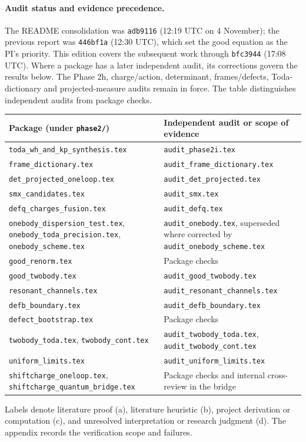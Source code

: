 \documentclass[11pt,a4paper]{article}
\newcommand{\file}[1]{\nolinkurl{#1}}
\theoremstyle{remark}\newtheorem{remark}[proposition]{Remark}
\begin{document}
\paragraph{Audit status and evidence precedence.}
The README consolidation was \file{adb9116} (12:19 UTC on 4 November);
the previous report was \file{446bf1a} (12:30 UTC), which set the good
equation as the PI's priority. This edition covers the subsequent work
through \file{bfc3944} (17:08 UTC). Where a package has a later independent
audit, its corrections govern the results below. The Phase 2h, charge/action, determinant,
frames/defects, Toda-dictionary and projected-measure audits remain in force.
The table distinguishes independent audits from package checks.
\begin{center}\small
\begin{tabular}{@{}L{7.2cm}L{7.2cm}@{}}\toprule
Package (under \file{phase2/}) & Independent audit or scope of evidence\\\midrule
\file{toda_wh_and_kp_synthesis.tex} & \file{audit_phase2i.tex}\\
\file{frame_dictionary.tex} & \file{audit_frame_dictionary.tex}\\
\file{det_projected_oneloop.tex} & \file{audit_det_projected.tex}\\
\file{smx_candidates.tex} & \file{audit_smx.tex}\\
\file{defq_charges_fusion.tex} & \file{audit_defq.tex}\\
\file{onebody_dispersion_test.tex}, \file{onebody_toda_precision.tex},
\file{onebody_scheme.tex} & \file{audit_onebody.tex}, superseded where corrected
by \file{audit_onebody_scheme.tex}\\
\file{good_renorm.tex} & Package checks\\
\file{good_twobody.tex} & \file{audit_good_twobody.tex}\\
\file{resonant_channels.tex} & \file{audit_resonant_channels.tex}\\
\file{defb_boundary.tex} & \file{audit_defb_boundary.tex}\\
\file{defect_bootstrap.tex} & Package checks\\
\file{twobody_toda.tex}, \file{twobody_cont.tex} &
\file{audit_twobody_toda.tex}, \file{audit_twobody_cont.tex}\\
\file{uniform_limits.tex} & \file{audit_uniform_limits.tex}\\
\file{shiftcharge_oneloop.tex}, \file{shiftcharge_quantum_bridge.tex} &
Package checks and internal cross-review in the bridge\\\bottomrule
\end{tabular}\end{center}
Labels denote literature proof (a), literature heuristic (b), project
derivation or computation (c), and unresolved interpretation or research
judgment (d). The appendix records the verification scope and failures.
\end{document}
